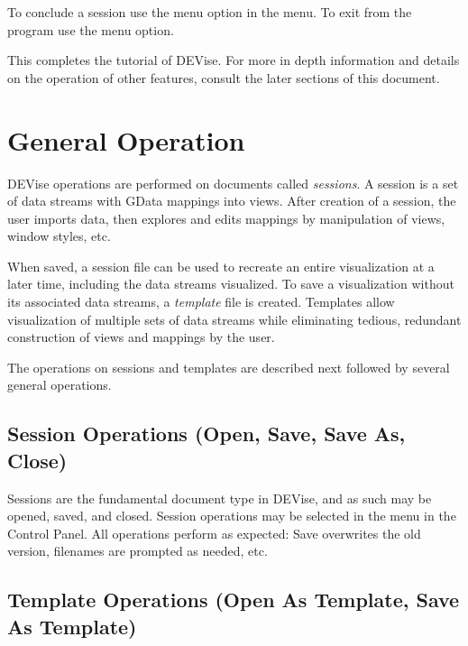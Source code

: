 To conclude a session use the  menu option in the 
menu. To exit from the program use the  menu option.

This completes the tutorial of DEVise. For more in depth information and details
on the operation of other features, consult the later sections of this
document.


\section{General Operation}

DEVise operations are performed on documents called {\em sessions}. A session is
a set of data streams with GData mappings into views. After creation of a
session, the user imports data, then explores and edits mappings by manipulation
of views, window styles, etc.

When saved, a session file can be used to recreate an entire visualization at a
later time, including the data streams visualized. To save a visualization
without its associated data streams, a {\em template} file is created. Templates
allow visualization of multiple sets of data streams while eliminating tedious,
redundant construction of views and mappings by the user.

The operations on sessions and templates are described next followed by several
general operations.


\subsection{Session Operations (Open, Save, Save As, Close)}

Sessions are the fundamental document type in DEVise, and as such may be opened,
saved, and closed. Session operations may be selected in the  menu
in the Control Panel. All operations perform as expected: Save overwrites the
old version, filenames are prompted as needed, etc.


\subsection{Template Operations (Open As Template, Save As Template)}


